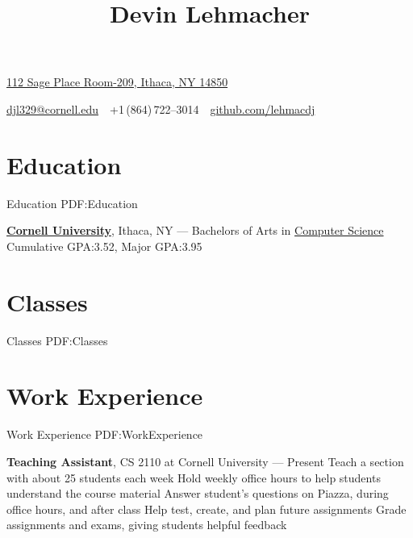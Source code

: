\documentclass[letterpaper,10pt,oneside]{simpleresume}
\newcommand{\CVAuthor}{Devin Lehmacher}
\newcommand{\CVWebpage}{github.com/lehmacdj}
\begin{document}
\begin{minipage}[t][0pt]{\linewidth}
\pagestyle{empty}

\title{\CVAuthor}

\begin{subtitle}
\href{https://www.google.com/maps/place/112+Sage+Pl+Room-209,+Ithaca,+NY+14850}
{112 Sage Place Room-209, Ithaca, NY 14850}
\par
\href{mailto:djl329@cornell.edu}
{djl329@cornell.edu}
\,\SubBulletSymbol\,
+1\,(864)\,722--3014
\,\SubBulletSymbol\,
\href{https://\CVWebpage}
{\CVWebpage}
\end{subtitle}

\begin{body}

\section%
{Education}
{Education}
{PDF:Education}

\href{https://www.cornell.edu}
{\textbf{Cornell University}}, Ithaca, NY
\hfill
{} ---
\BulletItem%
Bachelors of Arts in
\href{https://www.cs.cornell.edu}{Computer Science}
\BulletItem%
Cumulative GPA:\@ 3.52, Major GPA:\@ 3.95

\section%
{Classes}
{Classes}
{PDF:Classes}


\section%
{Work Experience}
{Work Experience}
{PDF:WorkExperience}

\textbf{Teaching Assistant}, CS 2110 at Cornell University
\hfill
{} --- Present
\BulletItem%
Teach a section with about 25 students each week
\BulletItem%
Hold weekly office hours to help students understand the course material
\BulletItem%
Answer student's questions on Piazza, during office hours, and after class
\BulletItem%
Help test, create, and plan future assignments
\BulletItem%
Grade assignments and exams, giving students helpful feedback


\end{body}
\end{minipage}
\end{document}
